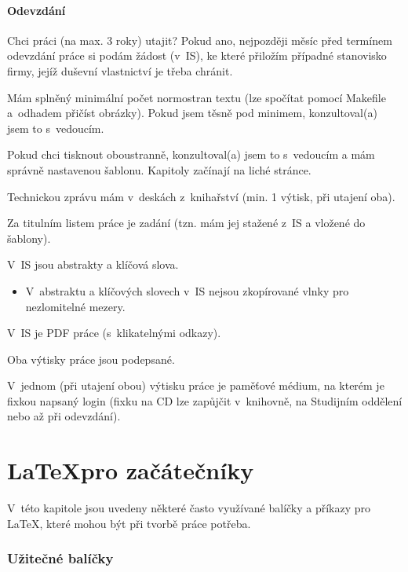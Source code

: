 \subsubsection*{Odevzdání}

\begin{checklist}
\item Chci práci (na max. 3 roky) utajit? Pokud ano, nejpozději měsíc před termínem odevzdání práce si podám žádost (v~IS), ke které přiložím případné stanovisko firmy, jejíž duševní vlastnictví je třeba chránit.
\item Mám splněný minimální počet normostran textu (lze spočítat pomocí Makefile a~odhadem přičíst obrázky). Pokud jsem těsně pod minimem, konzultoval(a) jsem to s~vedoucím.
\item Pokud chci tisknout oboustranně, konzultoval(a) jsem to s~vedoucím a mám správně nastavenou šablonu. Kapitoly začínají na liché stránce.
\item Technickou zprávu mám v~deskách z~knihařství (min. 1 výtisk, při utajení oba).
\item Za titulním listem práce je zadání (tzn. mám jej stažené z~IS a vložené do šablony).
\item V~IS jsou abstrakty a klíčová slova.
  \begin{itemize}
    \item V~abstraktu a klíčových slovech v~IS nejsou zkopírované vlnky pro nezlomitelné mezery.
  \end{itemize}      
\item V~IS je PDF práce (s~klikatelnými odkazy).
\item Oba výtisky práce jsou podepsané.
\item V~jednom (při utajení obou) výtisku práce je paměťové médium, na kterém je fixkou napsaný login (fixku na CD lze zapůjčit v~knihovně, na Studijním oddělení nebo až při odevzdání).
\end{checklist}


\chapter{\LaTeX pro začátečníky}
\label{latex}

V~této kapitole jsou uvedeny některé často využívané balíčky a příkazy pro \LaTeX{}, které mohou být při tvorbě práce potřeba.

\subsection*{Užitečné balíčky}

